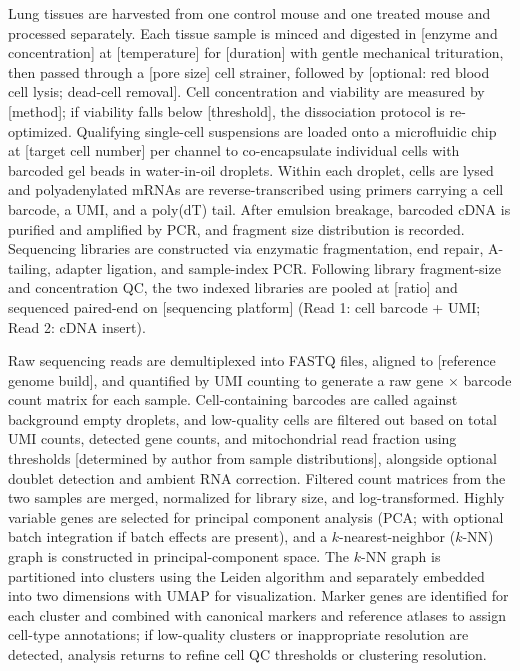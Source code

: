 \begin{BookNote}
Lung tissues are harvested from one control mouse and one treated mouse and processed separately. Each tissue sample is minced and digested in [enzyme and concentration] at [temperature] for [duration] with gentle mechanical trituration, then passed through a [pore size] cell strainer, followed by [optional: red blood cell lysis; dead-cell removal]. Cell concentration and viability are measured by [method]; if viability falls below [threshold], the dissociation protocol is re-optimized. Qualifying single-cell suspensions are loaded onto a microfluidic chip at [target cell number] per channel to co-encapsulate individual cells with barcoded gel beads in water-in-oil droplets. Within each droplet, cells are lysed and polyadenylated mRNAs are reverse-transcribed using primers carrying a cell barcode, a UMI, and a poly(dT) tail. After emulsion breakage, barcoded cDNA is purified and amplified by PCR, and fragment size distribution is recorded. Sequencing libraries are constructed via enzymatic fragmentation, end repair, A-tailing, adapter ligation, and sample-index PCR. Following library fragment-size and concentration QC, the two indexed libraries are pooled at [ratio] and sequenced paired-end on [sequencing platform] (Read 1: cell barcode + UMI; Read 2: cDNA insert).

Raw sequencing reads are demultiplexed into FASTQ files, aligned to [reference genome build], and quantified by UMI counting to generate a raw gene $\times$ barcode count matrix for each sample. Cell-containing barcodes are called against background empty droplets, and low-quality cells are filtered out based on total UMI counts, detected gene counts, and mitochondrial read fraction using thresholds [determined by author from sample distributions], alongside optional doublet detection and ambient RNA correction. Filtered count matrices from the two samples are merged, normalized for library size, and log-transformed. Highly variable genes are selected for principal component analysis (PCA; with optional batch integration if batch effects are present), and a $k$-nearest-neighbor ($k$-NN) graph is constructed in principal-component space. The $k$-NN graph is partitioned into clusters using the Leiden algorithm and separately embedded into two dimensions with UMAP for visualization. Marker genes are identified for each cluster and combined with canonical markers and reference atlases to assign cell-type annotations; if low-quality clusters or inappropriate resolution are detected, analysis returns to refine cell QC thresholds or clustering resolution.
\end{BookNote}

